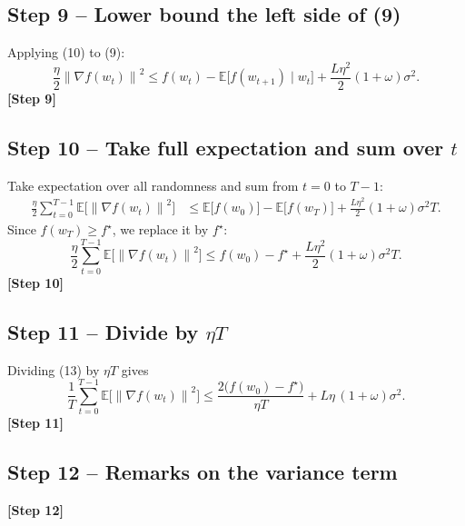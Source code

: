 \documentclass{article}
\newcommand{\E}{\mathbb{E}}
\newcommand{\norm}[1]{\left\lVert #1\right\rVert}
\newcommand{\grad}{\nabla}
\begin{document}
\subsection*{Step 9 – Lower bound the left side of (9)}
Applying (10) to (9):
\[
\frac{\eta}{2}\norm{\grad f(w_t)}^2
\le f(w_t)-\E\!\big[f(w_{t+1})\mid w_t\big]
   +\frac{L\eta^2}{2}(1+\omega)\sigma^2 .
\tag{11}
\]
\textbf{[Step 9]}

\subsection*{Step 10 – Take full expectation and sum over $t$}
Take expectation over all randomness and sum from $t=0$ to $T-1$:
\begin{align}
\frac{\eta}{2}\sum_{t=0}^{T-1}\E\!\big[\norm{\grad f(w_t)}^2\big]
&\le \E\!\big[f(w_0)\big]-\E\!\big[f(w_T)\big]
   +\frac{L\eta^2}{2}(1+\omega)\sigma^2 T .
\tag{12}
\end{align}
Since $f(w_T)\ge f^{\star}$, we replace it by $f^{\star}$:
\[
\frac{\eta}{2}\sum_{t=0}^{T-1}\E\!\big[\norm{\grad f(w_t)}^2\big]
\le f(w_0)-f^{\star}
   +\frac{L\eta^2}{2}(1+\omega)\sigma^2 T .
\tag{13}
\]
\textbf{[Step 10]}

\subsection*{Step 11 – Divide by $\eta T$}
Dividing (13) by $\eta T$ gives
\[
\frac{1}{T}\sum_{t=0}^{T-1}\E\!\big[\norm{\grad f(w_t)}^2\big]
\le \frac{2\big(f(w_0)-f^{\star}\big)}{\eta T}
   +L\eta\,(1+\omega)\sigma^2 .
\tag{14}
\]
\textbf{[Step 11]}

\subsection*{Step 12 – Remarks on the variance term}
\textbf{[Step 12]}
\end{document}
